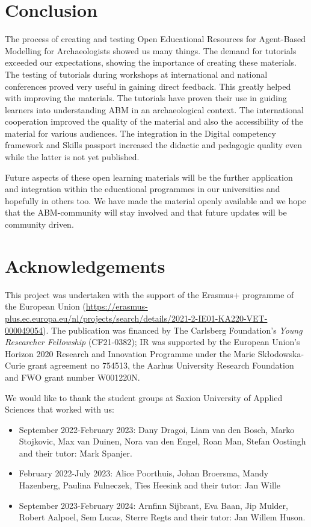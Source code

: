 \documentclass[
]{article}
\begin{document}
\hypertarget{conclusion}{%
\section{Conclusion}\label{conclusion}}

The process of creating and testing Open Educational Resources for Agent-Based Modelling for Archaeologists showed us many things. The demand for tutorials exceeded our expectations, showing the importance of creating these materials. The testing of tutorials during workshops at international and national conferences proved very useful in gaining direct feedback. This greatly helped with improving the materials. The tutorials have proven their use in guiding learners into understanding ABM in an archaeological context. The international cooperation improved the quality of the material and also the accessibility of the material for various audiences. The integration in the Digital competency framework and Skills passport increased the didactic and pedagogic quality even while the latter is not yet published.

Future aspects of these open learning materials will be the further application and integration within the educational programmes in our universities and hopefully in others too. We have made the material openly available and we hope that the ABM-community will stay involved and that future updates will be community driven.

\hypertarget{acknowledgements}{%
\section{Acknowledgements}\label{acknowledgements}}

This project was undertaken with the support of the Erasmus+ programme of the European Union (\url{https://erasmus-plus.ec.europa.eu/nl/projects/search/details/2021-2-IE01-KA220-VET-000049054}). The publication was financed by The Carlsberg Foundation's \emph{Young Researcher Fellowship} (CF21-0382); IR was supported by the European Union's Horizon 2020 Research and Innovation Programme under the Marie Skłodowska-Curie grant agreement no 754513, the Aarhus University Research Foundation and FWO grant number W001220N.

We would like to thank the student groups at Saxion University of Applied Sciences that worked with us:

\begin{itemize}
\item
  September 2022-February 2023: Dany Dragoi, Liam van den Bosch, Marko Stojkovic, Max van Duinen, Nora van den Engel, Roan Man, Stefan Oostingh and their tutor: Mark Spanjer.
\item
  February 2022-July 2023: Alice Poorthuis, Johan Broersma, Mandy Hazenberg, Paulina Fulneczek, Ties Heesink and their tutor: Jan Wille
\item
  September 2023-February 2024: Arnfinn Sijbrant, Eva Baan, Jip Mulder, Robert Aalpoel, Sem Lucas, Sterre Regts and their tutor: Jan Willem Huson.
\end{itemize}
\end{document}
